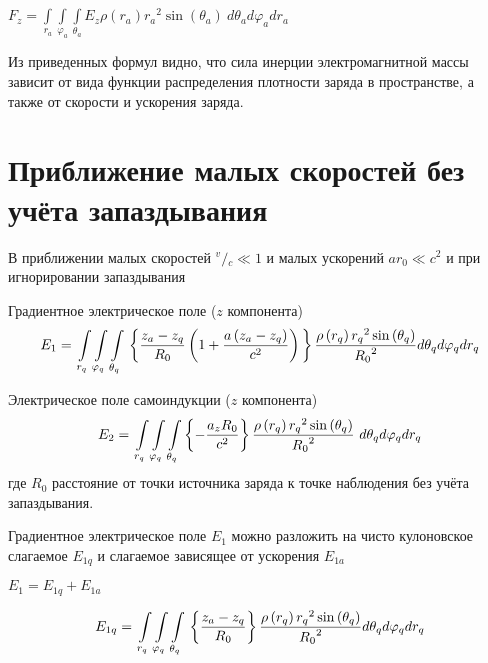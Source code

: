 \documentclass{article}
\begin{document}
${F}_{z}=\int\limits_{{{r}_{a}}}\int\limits_{{{\varphi}_{a}}}\int\limits_{{{\theta}_{a}}}{{E}_{z}\rho \left( {{r}_{a}} \right){{r}_{a}}^{2}\sin \left( {{\theta }_{a}} \right)}\ d{{\theta }_{a}}d{{\varphi }_{a}}d{{r}_{a}}$


Из приведенных формул видно, что сила инерции электромагнитной массы зависит от вида функции распределения плотности заряда в пространстве, а также от скорости и ускорения заряда.

\section{Приближение малых скоростей без учёта запаздывания}

В приближении малых скоростей ${}^{v}/{}_{c}\ll 1$  и малых ускорений $a{{r}_{0}}\ll {{c}^{2}}$ и при игнорировании запаздывания


Градиентное электрическое поле ($z$ компонента)
	\[{E}_{1}=\\
\int\limits_{{{r}_{q}}}\int\limits_{{{\varphi}_{q}}}\int\limits_{{{\theta}_{q}}}\\
\left\{ \frac{z_a-z_q}{{{R}_{0}}}\left( 1+\frac{a\left( {{z}_{a}}-{{z}_{q}} \right)}{c^2} \right) \\
 \right\}\\
\frac{\rho \left( {{r}_{q}} \right){{r}_{q}}^{2}\sin \left( {{\theta }_{q}} \right)}{{{R}_{0}}^{2}}\\
d{{\theta }_{q}}d{{\varphi }_{q}}d{{r}_{q}}\] 	

Электрическое поле самоиндукции ($z$ компонента)
\[{E}_{2}=\\
\int\limits_{{{r}_{q}}}\int\limits_{{{\varphi}_{q}}}\int\limits_{{{\theta}_{q}}}\\
{\left\{ -\frac{{a_z}R_{0}}{{{c}^{2}}} \right\}\\
\frac{\rho \left( {{r}_{q}} \right){{r}_{q}}^{2}\sin \left( {{\theta }_{q}} \right)}{{{R}_{0}}^{2}}\ }d{{\theta }_{q}}d{{\varphi }_{q}}d{{r}_{q}}\]
где ${R}_{0}$ расстояние от точки источника заряда к точке наблюдения без учёта запаздывания.


Градиентное электрическое поле ${E}_{1}$ можно разложить на чисто кулоновское слагаемое ${E}_{1q}$ и слагаемое зависящее от ускорения ${E}_{1a}$

${E}_{1} = {E}_{1q} + {E}_{1a}$

	\[{E}_{1q}=\\
\int\limits_{{{r}_{q}}}\int\limits_{{{\varphi}_{q}}}\int\limits_{{{\theta}_{q}}}\\
\left\{ \frac{z_a-z_q}{{{R}_{0}}} \\
 \right\}\\
\frac{\rho \left( {{r}_{q}} \right){{r}_{q}}^{2}\sin \left( {{\theta }_{q}} \right)}{{{R}_{0}}^{2}}\\
d{{\theta }_{q}}d{{\varphi }_{q}}d{{r}_{q}}\]
\end{document}
